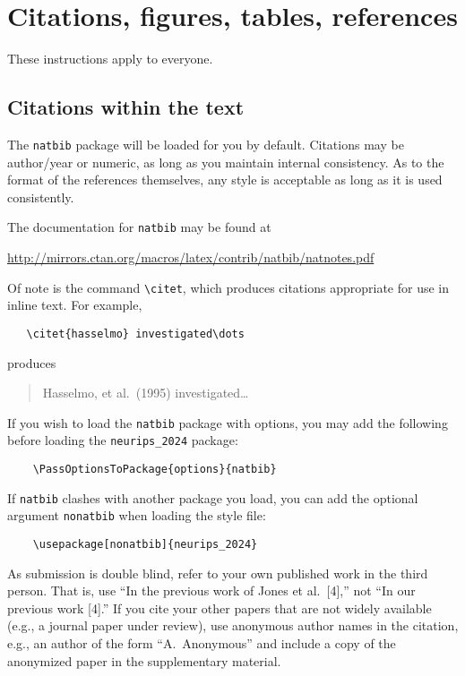 \documentclass{article}
\begin{document}
\section{Citations, figures, tables, references} \label{others}

These instructions apply to everyone.

\subsection{Citations within the text}

The \verb+natbib+ package will be loaded for you by default. Citations may be author/year or numeric, as long as you maintain internal consistency. As to the format of the references themselves, any style is acceptable as long as it is used consistently.

The documentation for \verb+natbib+ may be found at

\begin{center}
    \url{http://mirrors.ctan.org/macros/latex/contrib/natbib/natnotes.pdf}
\end{center}

Of note is the command \verb+\citet+, which produces citations appropriate for use in inline text. For example,

\begin{verbatim}
   \citet{hasselmo} investigated\dots
\end{verbatim}

produces

\begin{quote}
    Hasselmo, et al.\ (1995) investigated\dots
\end{quote}

If you wish to load the \verb+natbib+ package with options, you may add the following before loading the \verb+neurips_2024+ package:

\begin{verbatim}
    \PassOptionsToPackage{options}{natbib}
\end{verbatim}

If \verb+natbib+ clashes with another package you load, you can add the optional argument \verb+nonatbib+ when loading the style file:

\begin{verbatim}
    \usepackage[nonatbib]{neurips_2024}
\end{verbatim}

As submission is double blind, refer to your own published work in the third person. That is, use ``In the previous work of Jones et al.\ [4],'' not ``In our previous work [4].'' If you cite your other papers that are not widely available (e.g., a journal paper under review), use anonymous author names in the citation, e.g., an author of the form ``A.\ Anonymous'' and include a copy of the anonymized paper in the supplementary material.
\end{document}
